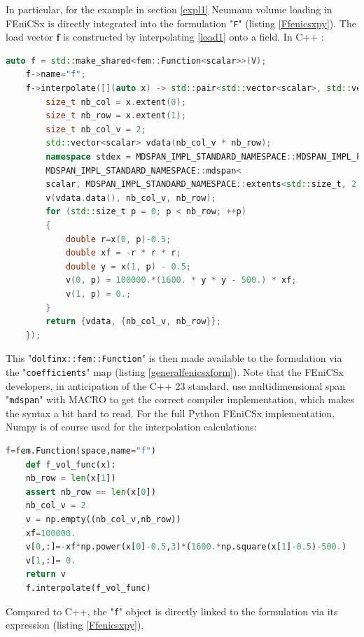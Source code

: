 \documentclass[12pt]{article}
\newcommand{\f}[1]{FEniCSx#1}
\newcommand{\vm}[1]{
	{\ensuremath{\mathbf{#1}}}
}
\newcommand{\mycode}[1]{\textsf{"}\lstinline`#1`\textsf{"}}
\newcommand{\mycodepy}[1]{\textsf{"}\lstinline[language=Python]`#1`\textsf{"}}
\begin{document}
In particular, for the example in section \ref{expl1} Neumann volume loading in \f{} is directly integrated into the formulation \mycode{F} (listing \ref{Ffenicsxpy}).
The load vector $\vm{f}$ is constructed by interpolating \eqref{load1} onto a field. In C++ : 
\begin{lstlisting}[numbers=none,basicstyle=\footnotesize,language=c++]
	auto f = std::make_shared<fem::Function<scalar>>(V);
	f->name="f";
	f->interpolate([](auto x) -> std::pair<std::vector<scalar>, std::vector<std::size_t>> {
		size_t nb_col = x.extent(0);
		size_t nb_row = x.extent(1);
		size_t nb_col_v = 2;
		std::vector<scalar> vdata(nb_col_v * nb_row);
		namespace stdex = MDSPAN_IMPL_STANDARD_NAMESPACE::MDSPAN_IMPL_PROPOSED_NAMESPACE;
		MDSPAN_IMPL_STANDARD_NAMESPACE::mdspan<
		scalar, MDSPAN_IMPL_STANDARD_NAMESPACE::extents<std::size_t, 2, MDSPAN_IMPL_STANDARD_NAMESPACE::dynamic_extent>>
		v(vdata.data(), nb_col_v, nb_row);
		for (std::size_t p = 0; p < nb_row; ++p)
		{
			double r=x(0, p)-0.5;
			double xf = -r * r * r;
			double y = x(1, p) - 0.5;
			v(0, p) = 100000.*(1600. * y * y - 500.) * xf;
			v(1, p) = 0.;
		}
		return {vdata, {nb_col_v, nb_row}};
	});
\end{lstlisting}
This \mycode{dolfinx::fem::Function} is then made available to the formulation via the \mycode{coefficients} map (listing \ref{generalfenicsxform}). 
Note that the \f{} developers, in anticipation of the C++ 23 standard, use multidimensional span \mycode{mdspan} with MACRO to get the correct compiler implementation, which makes the syntax a bit hard to read.	
For the full Python \f{} implementation, Numpy is of course used for the interpolation calculations:
\begin{lstlisting}[numbers=none,basicstyle=\footnotesize,language=python]
	f=fem.Function(space,name="f")
	def f_vol_func(x):
	nb_row = len(x[1])
	assert nb_row == len(x[0])
	nb_col_v = 2
	v = np.empty((nb_col_v,nb_row))
	xf=100000.
	v[0,:]=-xf*np.power(x[0]-0.5,3)*(1600.*np.square(x[1]-0.5)-500.)
	v[1,:]= 0.
	return v
	f.interpolate(f_vol_func)
\end{lstlisting}
Compared to C++, the \mycodepy{f} object is directly linked to the formulation via its expression (listing \ref{Ffenicsxpy}).
\end{document}
